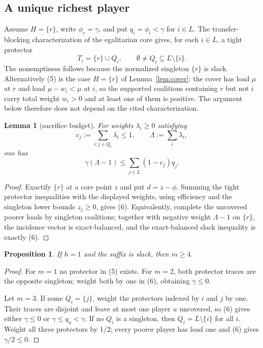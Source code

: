 \documentclass[11pt]{article}
\newtheorem{lemma}[theorem]{Lemma}
\newtheorem{proposition}[theorem]{Proposition}
\begin{document}
\subsection{A unique richest player}

Assume $H=\{r\}$, write $\phi_r=\gamma$, and put
$q_i=\phi_i<\gamma$ for $i\in L$.  The transfer-blocking characterization of
the egalitarian core \citep{ArinInarra2001} gives, for each $i\in L$, a tight
protector
\[
 T_i=\{r\}\cup Q_i,\qquad
 \emptyset\ne Q_i\subseteq L\setminus\{i\}.          \tag{5}
\]
The nonemptiness follows because the normalized singleton $\{r\}$ is slack.
Alternatively (5) is the case $H=\{r\}$ of Lemma~\ref{lem:cover}: the cover
has load $\mu$ at $r$ and load $\mu-w_i<\mu$ at $i$, so the supported
coalitions containing $r$ but not $i$ carry total weight $w_i>0$ and at least
one of them is positive.  The argument below therefore does not depend on the
cited characterization.

\begin{lemma}[sacrifice budget]\label{lem:sacrifice}
For weights $\lambda_i\ge0$ satisfying
\[
 c_j:=\sum_{i:j\in Q_i}\lambda_i\le1,\qquad
 \Lambda:=\sum_i\lambda_i,
\]
one has
\[
 \gamma(\Lambda-1)\le\sum_{j\in L}(1-c_j)q_j.        \tag{6}
\]
\end{lemma}

\begin{proof}
Exactify $\{r\}$ at a core point $z$ and put $d=z-\phi$.  Summing the
tight protector inequalities with the displayed weights, using efficiency
and the singleton lower bounds $z_j\ge0$, gives (6).  Equivalently, complete
the uncovered poorer loads by singleton coalitions; together with negative
weight $\Lambda-1$ on $\{r\}$, the incidence vector is exact-balanced, and
the exact-balanced slack inequality is exactly (6).
\end{proof}

\begin{proposition}\label{prop:h1}
If $h=1$ and the suffix is slack, then $m\ge4$.
\end{proposition}

\begin{proof}
For $m=1$ no protector in (5) exists.  For $m=2$, both protector traces are
the opposite singleton; weight both by one in (6), obtaining
$\gamma\le0$.

Let $m=3$.  If some $Q_i=\{j\}$, weight the protectors indexed by $i$ and
$j$ by one.  Their traces are disjoint and leave at most one player $u$
uncovered, so (6) gives either $\gamma\le0$ or
$\gamma\le q_u<\gamma$.  If no $Q_i$ is a singleton, then
$Q_i=L\setminus\{i\}$ for all $i$.  Weight all three protectors by $1/2$;
every poorer player has load one and (6) gives $\gamma/2\le0$.
\end{proof}
\end{document}
